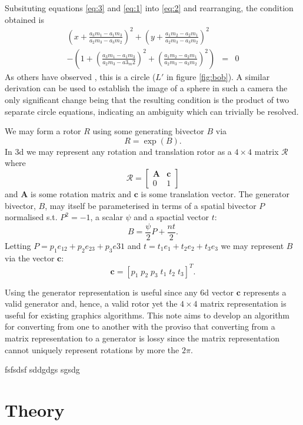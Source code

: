 Subsituting equations \ref{eq:3} and \ref{eq:1} into \ref{eq:2} and rearranging, the condition obtained is 
\begin{eqnarray}
  \left(x + \frac{a_3m_1 - a_1m_3}{a_2m_3 -a_3m_2}\right)^2 + \left(y + \frac{a_1m_2 - a_2m_1}{a_2m_3 - a_3m_2}\right)^2 \nonumber&&\\- \left(1 + \left(\frac{a_3m_1 - a_1m_3}{a_2m_3 - a3_m2}\right)^2 + \left(\frac{a_1m_2 - a_2m_1}{a_2m_3 -a_3m_2}\right)^2\right) &=& 0
\end{eqnarray} 
As others have observed \cite{CAM:gd}, this is a circle ($L'$ in figure
		\ref{fig:bob}). A similar derivation can be used to establish
the image of a sphere in such a camera the only significant change being that
the resulting condition is the product of two separate circle equations,
    indicating an ambiguity which can trivially be resolved.  \nocite{CAM:bclf}

We may form a rotor $R$ using some generating
bivector $B$ via
\[
R = \exp(B).
\]
In 3d we may represent any rotation and
translation rotor as a $4\times4$ matrix $\mathcal{R}$ where
\[
\mathcal{R} = \left[
\begin{array}{cc}
\mathbf{A} & \mathbf{c} \\
                0 & 1
\end{array}
\right]
\]
and $\mathbf{A}$ is some rotation matrix and $\mathbf{c}$ is some
translation vector. The generator bivector, $B$, may itself be
parameterised in terms of a spatial bivector $P$ normalised s.t.
$P^2 = -1$, a scalar $\psi$ and a spactial vector $t$:
\[
B = \frac{\psi}{2} P + \frac{nt}{2}.
\]
Letting $P = p_1 e_{12} + p_2 e_{23} + p_3 e{31}$ and
$t = t_1 e_1 + t_2 e_2 + t_3 e_3$ we may represent $B$ via the
vector $\mathbf{c}$:
\[
\mathbf{c} = [ p_1 \; p_2 \; p_3 \; t_1 \; t_2 \; t_3 ]^T.
\]

Using the generator representation is useful since any 6d vector
$\mathbf{c}$ represents a valid generator and, hence, a valid rotor yet
the $4\times4$ matrix representation is useful for existing graphics
algorithms. This note aims to develop an algorithm for converting from
one to another with the proviso that converting from a matrix representation
to a generator is lossy since the matrix representation cannot uniquely
represent rotations by more the $2\pi$.

fsfsdsf
 sddgdgs sgsdg

\section{Theory}


